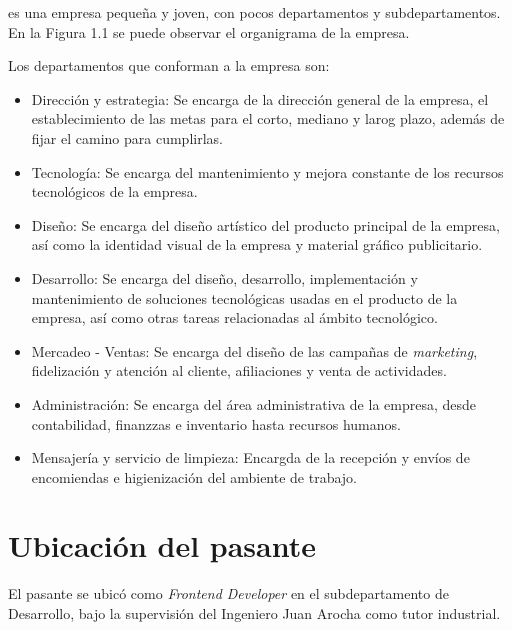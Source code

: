\business es una empresa pequeña y joven, con pocos departamentos y subdepartamentos. En la Figura 1.1 se puede observar el organigrama de la empresa.


Los departamentos que conforman a la empresa son:

\begin{itemize}
  \item Dirección y estrategia: Se encarga de la dirección general de la empresa, el establecimiento de las metas para el corto, mediano y larog plazo, además de fijar el camino para cumplirlas.
  \item Tecnología: Se encarga del mantenimiento y mejora constante de los recursos tecnológicos de la empresa.
  \item Diseño: Se encarga del diseño artístico del producto principal de la empresa, así como la identidad visual de la empresa y material gráfico publicitario.
  \item Desarrollo: Se encarga del diseño, desarrollo, implementación y mantenimiento de soluciones tecnológicas usadas en el producto de la empresa, así como otras tareas relacionadas al ámbito tecnológico.
  \item Mercadeo - Ventas: Se encarga del diseño de las campañas de \textit{marketing}, fidelización y atención al cliente, afiliaciones y venta de actividades.
  \item Administración: Se encarga del área administrativa de la empresa, desde contabilidad, finanzzas e inventario hasta recursos humanos.
  \item Mensajería y servicio de limpieza: Encargda de la recepción y envíos de encomiendas e higienización del ambiente de trabajo.
\end{itemize}

\section{Ubicación del pasante}

El pasante se ubicó como \textit{Frontend Developer} en el subdepartamento de Desarrollo, bajo la supervisión del Ingeniero Juan Arocha como tutor industrial.
